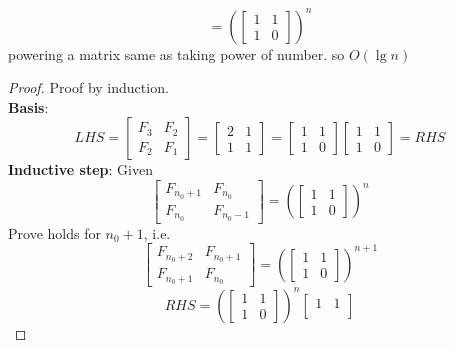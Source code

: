 \documentclass[11pt]{article}
\begin{document}
\begin{example}
\begin{solution}
\begin{enumerate}
\[      =
      \left(\begin{bmatrix}
        1 & 1 \\
        1 & 0
      \end{bmatrix}\right)^n
    \]
    powering a matrix same as taking power of number. so $O(\lg n)$
    \begin{proof}
      Proof by induction. \\
      \textbf{Basis}:
      \[
        LHS = \begin{bmatrix}
        F_3 & F_2 \\
        F_2 & F_1
      \end{bmatrix} = \begin{bmatrix}
        2 & 1 \\
        1 & 1
      \end{bmatrix}
      = \begin{bmatrix}
        1 & 1 \\
        1 & 0
    \end{bmatrix} \begin{bmatrix}
      1 & 1 \\
      1 & 0
  \end{bmatrix} = RHS
      \]
      \textbf{Inductive step}: Given
      \[
        \begin{bmatrix}
          F_{n_0+1} & F_{n_0} \\
          F_{n_0} & F_{n_0-1}
        \end{bmatrix}
        =
        \left(\begin{bmatrix}
          1 & 1 \\
          1 & 0
        \end{bmatrix}\right)^n
      \]
      Prove holds for $n_0+1$, i.e.
      \[
        \begin{bmatrix}
          F_{n_0+2} & F_{n_0+1} \\
          F_{n_0 + 1} & F_{n_0}
        \end{bmatrix}
        =
        \left(\begin{bmatrix}
          1 & 1 \\
          1 & 0
        \end{bmatrix}\right)^{n+1}
      \]
      \[
        RHS = \left(\begin{bmatrix}
          1 & 1 \\
          1 & 0
        \end{bmatrix}\right)^n \begin{bmatrix}
          1 & 1 \\

\end{bmatrix}\]
\end{proof}
\end{enumerate}
\end{solution}
\end{example}
\end{document}
